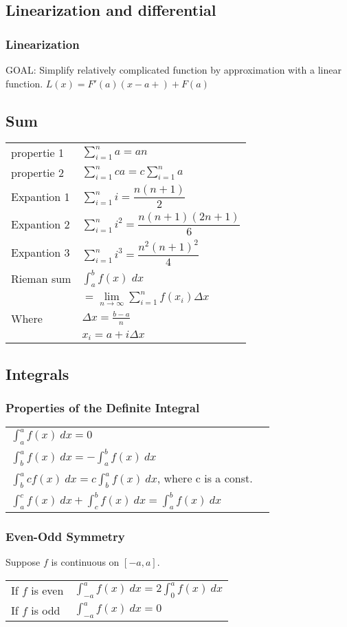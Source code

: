 \documentclass[5pt]{article}
\begin{document}
\begin{multicols}{3}
\subsection{Linearization and differential}
\subsubsection{Linearization}
GOAL: Simplify relatively complicated function by approximation with a linear function.
$L(x)=F'(a)(x-a+)+F(a)$

\subsection{Sum}
\begin{tabular}{ll}
propertie 1 & $\sum^n_{i=1}a=an$\\
propertie 2 & $\sum^n_{i=1}ca=c\sum^n_{i=1}a$\\
Expantion 1 & $\sum^n_{i=1}i=\dfrac{n(n+1)}{2}$\\
Expantion 2 & $\sum^n_{i=1}i^2=\dfrac{n(n+1)(2n+1)}{6}$\\
Expantion 3 & $\sum^n_{i=1}i^3=\dfrac{n^2(n+1)^2}{4}$\\
 Rieman sum & $\int_a^bf(x)\;dx$\\
 & $=\lim\limits_{n\to\infty}\sum^n_{i=1}f(x_i)\Delta x$\\
 Where & $\Delta x = \frac{b-a}{n}$\\
 & $x_i=a+i\Delta x$
\end{tabular}

\subsection{Integrals}
\subsubsection{Properties of the Definite Integral}
\begin{tabular}{ll}
$\int^a_af(x)\:dx=0$ & \\
$\int^a_bf(x)\:dx=-\int^b_af(x)\:dx$ & \\
$\int^a_bcf(x)\:dx=c\int^a_bf(x)\:dx$, where c is a const. & \\
$\int^c_af(x)\:dx+\int^b_cf(x)\:dx=\int^b_af(x)\:dx$& \\
\end{tabular}

\subsubsection{Even-Odd Symmetry}
Suppose $f$ is continuous on $[-a,a]$.\\
\begin{tabular}{ll}
If $f$ is even & $\int^a_{-a}f(x)\:dx=2\int^a_0f(x)\:dx$\\
If $f$ is odd & $\int^a_{-a}f(x)\:dx=0$\\
\end{tabular}


\end{multicols}
\end{document}
